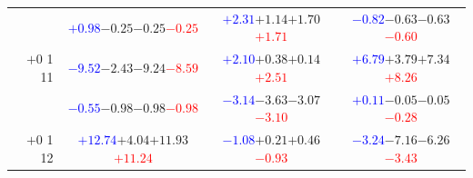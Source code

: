 \documentclass[compress]{beamer}
\begin{document}
\begin{frame}
\begin{tabular}{r | c | c | c}
          & \textcolor{blue}{$+0.98$}\hspace{0.1 cm}$-0.25$\hspace{0.1 cm}$-0.25$\hspace{0.1 cm}\textcolor{red}{$-0.25$} & \textcolor{blue}{$+2.31$}\hspace{0.1 cm}$+1.14$\hspace{0.1 cm}$+1.70$\hspace{0.1 cm}\textcolor{red}{$+1.71$} & \textcolor{blue}{$-0.82$}\hspace{0.1 cm}$-0.63$\hspace{0.1 cm}$-0.63$\hspace{0.1 cm}\textcolor{red}{$-0.60$} \\
$+$0 1 11 & \textcolor{blue}{$-9.52$}\hspace{0.1 cm}$-2.43$\hspace{0.1 cm}$-9.24$\hspace{0.1 cm}\textcolor{red}{$-8.59$} & \textcolor{blue}{$+2.10$}\hspace{0.1 cm}$+0.38$\hspace{0.1 cm}$+0.14$\hspace{0.1 cm}\textcolor{red}{$+2.51$} & \textcolor{blue}{$+6.79$}\hspace{0.1 cm}$+3.79$\hspace{0.1 cm}$+7.34$\hspace{0.1 cm}\textcolor{red}{$+8.26$} \\
          & \textcolor{blue}{$-0.55$}\hspace{0.1 cm}$-0.98$\hspace{0.1 cm}$-0.98$\hspace{0.1 cm}\textcolor{red}{$-0.98$} & \textcolor{blue}{$-3.14$}\hspace{0.1 cm}$-3.63$\hspace{0.1 cm}$-3.07$\hspace{0.1 cm}\textcolor{red}{$-3.10$} & \textcolor{blue}{$+0.11$}\hspace{0.1 cm}$-0.05$\hspace{0.1 cm}$-0.05$\hspace{0.1 cm}\textcolor{red}{$-0.28$} \\
$+$0 1 12 & \textcolor{blue}{$+12.74$}\hspace{0.1 cm}$+4.04$\hspace{0.1 cm}$+11.93$\hspace{0.1 cm}\textcolor{red}{$+11.24$} & \textcolor{blue}{$-1.08$}\hspace{0.1 cm}$+0.21$\hspace{0.1 cm}$+0.46$\hspace{0.1 cm}\textcolor{red}{$-0.93$} & \textcolor{blue}{$-3.24$}\hspace{0.1 cm}$-7.16$\hspace{0.1 cm}$-6.26$\hspace{0.1 cm}\textcolor{red}{$-3.43$} \\

\end{tabular}
\end{frame}
\end{document}
